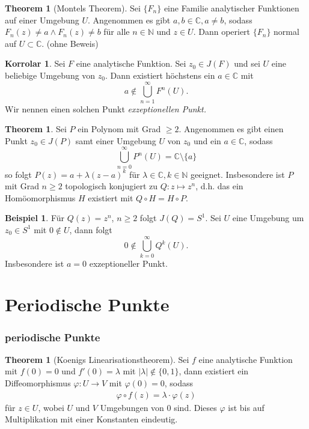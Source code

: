 \documentclass{beamer}
\renewcommand{\phi}{\varphi}
\newcommand{\C}{\mathbb{C}}
\newcommand{\N}{\mathbb{N}}
\theoremstyle{definition}
\newcounter{foo}
\newtheorem{thm}[foo]{Theorem}
\newtheorem{kor}[foo]{Korrolar}
\newtheorem{ex}[foo]{Beispiel}
\begin{document}
\begin{frame}
\begin{thm}[Montels Theorem] \label{8}
Sei $\{F_n\}$ eine Familie analytischer Funktionen auf einer Umgebung $U$. Angenommen es gibt $a,b \in \C, a\neq b$, sodass $F_n(z)\neq a \land F_n(z)\neq b$ für alle $n\in \N$ und $z\in U$. Dann operiert $\{F_n\}$ normal auf $U\subset \C$. (ohne Beweis) 
\end{thm}

\begin{kor} \label{9}
Sei $F$ eine analytische Funktion. Sei $z_0\in J(F)$ und sei $U$ eine beliebige Umgebung von $z_0$. Dann existiert höchstens ein $a\in \C$ mit
\[
	a\not\in \bigcup_{n=1}^\infty F^n(U).
\]
Wir nennen einen solchen Punkt \emph{exzeptionellen Punkt.}
\end{kor}
\end{frame}

\begin{frame}
\begin{thm}\label{10}
Sei $P$ ein Polynom mit Grad $\ge 2$. Angenommen es gibt einen Punkt $z_0\in J(P)$ samt einer Umgebung $U$ von $z_0$ und ein $a\in \C$, sodass 
\[
\bigcup_{n=0}^\infty P^{n}(U)=\C\setminus\{a\}
\]
so folgt $P(z)=a+\lambda(z-a)^k$ für $\lambda \in \C, k\in \N$ geeignet. 
Insbesondere ist $P$ mit Grad $n\ge 2$ topologisch konjugiert zu $Q: z \mapsto z^n$, d.h. 
das ein Homöomorphismus $H$ existiert mit $Q\circ H=H\circ P$.
\end{thm}
\end{frame}
\begin{frame}
\begin{ex} \label{11}
Für $Q(z)=z^n$, $n\ge 2$ folgt $J(Q)=S^1$. Sei $U$ eine Umgebung um $z_0\in S^1$ mit $0\not\in U$, dann folgt 
\[
0\not\in \bigcup_{k=0}^\infty Q^k(U).
\] 
Insbesondere ist $a=0$ exzeptioneller Punkt.
\end{ex}
\end{frame}

\section{Periodische Punkte}
\begin{frame}
\frametitle{periodische Punkte}
\begin{thm}[Koenigs Linearisationstheorem] \label{12}
Sei $f$ eine analytische Funktion mit $f(0)=0$ und $f'(0)=\lambda$ mit 
$|\lambda|\not\in\{0,1\}$, dann existiert ein Diffeomorphismus $\phi: U\to V$ mit 
$\phi(0)=0$, sodass 
\begin{align}
\phi \circ f(z)=\lambda\cdot \phi(z)  \label{*}\tag{$*$}
\end{align}
für $z\in U$, wobei $U$ und $V$ Umgebungen von $0$ sind. Dieses $\phi$ ist bis auf Multiplikation mit einer Konstanten eindeutig.
\end{thm}
\end{frame}
\end{document}
